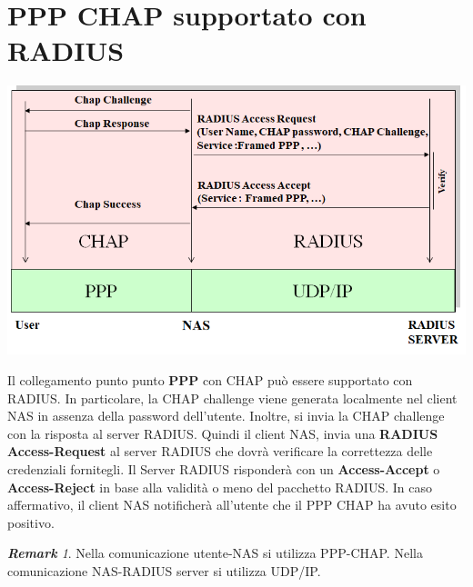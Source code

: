 \documentclass{book}
\theoremstyle{remark}
\newtheorem*{remark}{\textbf{Remark}}
\begin{document}
\section{PPP CHAP supportato con RADIUS}
\begin{center}
	\includegraphics[scale=0.4]{PPPCHAPRADIUS.png}
\end{center}
Il collegamento punto punto \textbf{PPP} con CHAP può essere supportato con RADIUS\@. In particolare, la CHAP challenge viene generata localmente nel client NAS in assenza della password dell'utente\@. Inoltre, si invia la CHAP challenge con la risposta al server RADIUS\@. Quindi il client NAS, invia una \textbf{RADIUS Access-Request} al server RADIUS che dovrà verificare la correttezza delle credenziali fornitegli\@. Il Server RADIUS risponderà con un \textbf{Access-Accept} o \textbf{Access-Reject} in base alla validità o meno del pacchetto RADIUS\@. In caso affermativo, il client NAS notificherà all'utente che il PPP CHAP ha avuto esito positivo\@.
\begin{remark}
	Nella comunicazione utente-NAS si utilizza PPP-CHAP\@.\newline
	Nella comunicazione NAS-RADIUS server si utilizza UDP/IP\@.
\end{remark}
\end{document}
